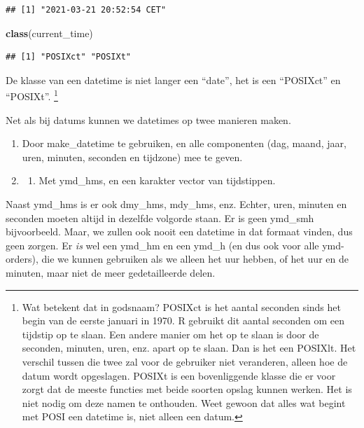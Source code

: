 \documentclass[]{tufte-book}
\newenvironment{Shaded}{}{}
\newcommand{\KeywordTok}[1]{\textcolor[rgb]{0.00,0.44,0.13}{\textbf{#1}}}
\newcommand{\NormalTok}[1]{#1}
\providecommand{\tightlist}{%
  \setlength{\itemsep}{0pt}\setlength{\parskip}{0pt}}
\begin{document}
\begin{verbatim}
## [1] "2021-03-21 20:52:54 CET"
\end{verbatim}

\begin{Shaded}
\begin{Highlighting}[]
\KeywordTok{class}\NormalTok{(current_time)}
\end{Highlighting}
\end{Shaded}

\begin{verbatim}
## [1] "POSIXct" "POSIXt"
\end{verbatim}

De klasse van een datetime is niet langer een ``date'', het is een ``POSIXct'' en ``POSIXt''. \footnote{Wat betekent dat in godsnaam? POSIXct is het aantal seconden sinds het begin van de eerste januari in 1970. R gebruikt dit aantal seconden om een tijdstip op te slaan. Een andere manier om het op te slaan is door de seconden, minuten, uren, enz. apart op te slaan. Dan is het een POSIXlt. Het verschil tussen die twee zal voor de gebruiker niet veranderen, alleen hoe de datum wordt opgeslagen. POSIXt is een bovenliggende klasse die er voor zorgt dat de meeste functies met beide soorten opslag kunnen werken. Het is niet nodig om deze namen te onthouden. Weet gewoon dat alles wat begint met POSI een datetime is, niet alleen een datum.}

Net als bij datums kunnen we datetimes op twee manieren maken.

\begin{enumerate}
\def\labelenumi{\arabic{enumi}.}
\item
  Door make\_datetime te gebruiken, en alle componenten (dag, maand, jaar, uren, minuten, seconden en tijdzone) mee te geven.
\item
  \begin{enumerate}
  \def\labelenumii{\arabic{enumii}.}
  \setcounter{enumii}{1}
  \tightlist
  \item
    Met ymd\_hms, en een karakter vector van tijdstippen.
  \end{enumerate}
\end{enumerate}

Naast ymd\_hms is er ook dmy\_hms, mdy\_hms, enz. Echter, uren, minuten en seconden moeten altijd in dezelfde volgorde staan. Er is geen ymd\_smh bijvoorbeeld. Maar, we zullen ook nooit een datetime in dat formaat vinden, dus geen zorgen. Er \emph{is} wel een ymd\_hm en een ymd\_h (en dus ook voor alle ymd-orders), die we kunnen gebruiken als we alleen het uur hebben, of het uur en de minuten, maar niet de meer gedetailleerde delen.
\end{document}
